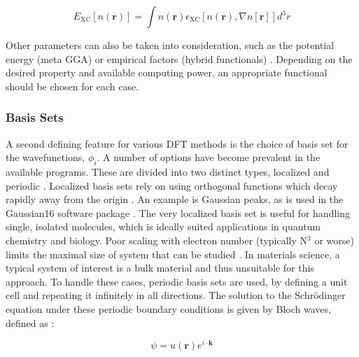 \begin{equation}
E_{\mathrm{XC}}[n(\textbf{r})] = \int  n(\textbf{r}) \epsilon_{\mathrm{XC}}[n(\textbf{r}), \nabla n[\textbf{r}]] d^3r
\end{equation}


Other parameters can also be taken into consideration, such as the potential energy (meta GGA) or empirical factors (hybrid functionals) \cite{tao_climbing_2003, bj_pot}.  Depending on the desired property and available computing power, an appropriate functional should be chosen for each case.


\subsubsection{Basis Sets}
A second defining feature for various DFT methods is the choice of basis set for the wavefunctions, $\phi_i$.   A number of options have become prevalent in the available programs.  These are divided into two distinct types, localized and periodic \cite{sholl_density_2009}.  Localized basis sets rely on using orthogonal functions which decay rapidly away from the origin \cite{sholl_density_2009}.  An example is Gaussian peaks, as is used in the Gaussian16 software package \cite{g16}.  The very localized basis set is useful for handling single, isolated molecules, which is ideally suited applications in quantum chemistry and biology. Poor scaling with electron number (typically N$^3$ or worse) limits the maximal size of system that can be studied \cite{mohr_linear_2018}.  In materials science, a typical system of interest is a bulk material and thus unsuitable for this approach.  To handle these cases, periodic basis sets are used, by defining a unit cell and repeating it infinitely in all directions.  The solution to the Schr\"odinger equation under these periodic boundary conditions is given by Bloch waves, defined as \cite{griffiths}:

\begin{equation}
	\psi = u(\textbf{r}) e^{i\cdot \textbf{k}}
\end{equation}

